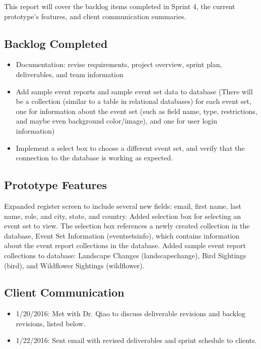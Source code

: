 
This report will cover the backlog items completed in Sprint 4, the current prototype's features, and client communication summaries. 

 \subsection{Backlog Completed}
\begin{itemize}
\item Documentation: revise requirements, project overview, sprint plan, deliverables, and team information
\item Add sample event reports and sample event set data to database (There will be a collection (similar to a table in relational databases) for each event set, one for information about the event set (such as field name, type, restrictions, and maybe even background color/image), and one for user login information) 
\item Implement a select box to choose a different event set, and verify that the connection to the database is working as expected.
\end{itemize}
 
 \subsection{Prototype Features}
 Expanded register screen to include several new fields: email, first name, last name, role, and city, state, and country.  Added selection box for selecting an event set to view. The selection box references a newly created collection in the database, Event Set Information (eventsetsinfo), which contains information about the event report collections in the database. Added sample event report collections to database: Landscape Changes (landscapechange), Bird Sightings (bird), and Wildflower Sightings (wildflower).


\subsection{Client Communication}
\begin{itemize}
\item 1/20/2016: Met with Dr. Qiao to discuss deliverable revisions and backlog revisions, listed below.
\item 1/22/2016: Sent email with revised deliverables and sprint schedule to clients.
\end{itemize}

